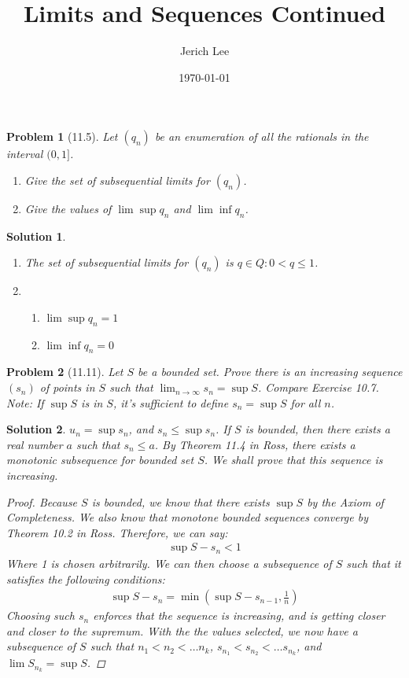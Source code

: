 \documentclass[12pt]{article}
\title{Limits and Sequences Continued}
\author{Jerich Lee}
\date{\today}
\newtheorem{problem}{Problem}
\newtheorem{solution}{Solution}
\begin{document}
\maketitle

\begin{problem}[11.5]
Let $(q_n)$ be an enumeration of all the rationals in the interval $(0,1]$.
\begin{enumerate}
    \item Give the set of subsequential limits for $(q_n)$.
    \item Give the values of $\lim \sup q_n$ and $\lim \inf q_n$. 
\end{enumerate}
\end{problem}
\begin{solution}
    \begin{enumerate}      
  \item The set of subsequential limits for $(q_{n} )$ is ${q \in Q : 0 < q \leq 1}$. 
  \item  \begin{enumerate}
 \item $\lim \sup q_{n} =1$   
 \item $\lim \inf q_{n} = 0$ 
  \end{enumerate}    
   \end{enumerate}
\end{solution}

\begin{problem}[11.11]
    Let $S$ be a bounded set. Prove there is an increasing sequence $(s_n)$ of points in $S$ such that $\lim_{n \to \infty} s_n=\sup S$. Compare Exercise 10.7. Note: If $\sup S$ is in $S$, it's sufficient to define $s_n=\sup S$ for all $n$.  
\end{problem}

\begin{solution}
$u_{n} =\sup s_{n} $, and $s_{n} \leq \sup s_{n} $. If $S$ is bounded, then there exists a real number $a$ such that $s_{n} \leq a$. By Theorem 11.4 in Ross, there exists a monotonic subsequence for bounded set $S$. We shall prove that this sequence is increasing.
\begin{proof}
    Because $S$ is bounded, we know that there exists $\sup S$ by the Axiom of Completeness. We also know that monotone bounded sequences converge by Theorem 10.2 in Ross. Therefore, we can say:
    \begin{align}
        \sup S-s_{n} <1
    \end{align}
    Where 1 is chosen arbitrarily. We can then choose a subsequence of $S$ such that it satisfies the following conditions:
    \begin{align}
        \sup S - s_n = \min \left( \sup S - s_{n-1}, \frac{1}{n} \right)
    \end{align}
    Choosing such $s_{n} $ enforces that the sequence is increasing, and is getting closer and closer to the supremum. With the the values selected, we now have a subsequence of $S$ such that $n_1<n_{2}<\ldots n_k $, $s_{n_1}<s_{n_2}<\ldots s_{n_k}$, and $\lim S_{n_k} = \sup S$.  
\end{proof} 
\end{solution}
\end{document}
